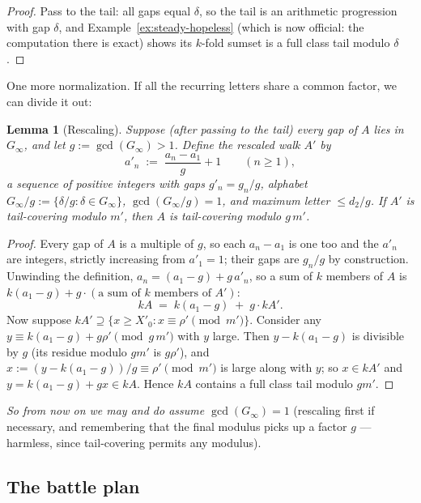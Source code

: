 \documentclass[11pt,reqno]{amsart}
\theoremstyle{plain}
\newtheorem{lemma}[theorem]{Lemma}
\theoremstyle{definition}
\theoremstyle{remark}
\newcommand{\Ginf}{G_\infty}
\begin{document}
\begin{proof}
Pass to the tail: all gaps equal $\delta$, so the tail is an arithmetic progression
with gap $\delta$, and Example~\ref{ex:steady-hopeless} (which is now official: the
computation there is exact) shows its $k$-fold sumset is a full class tail modulo
$\delta$.
\end{proof}

One more normalization. If all the recurring letters share a common factor, we can
divide it out:

\begin{lemma}[Rescaling]\label{lem:rescale-friendly}
Suppose (after passing to the tail) every gap of $A$ lies in $\Ginf$, and let
$g := \gcd(\Ginf) > 1$. Define the \emph{rescaled walk} $A'$ by
\[
  a'_n \;:=\; \frac{a_n - a_1}{g} + 1 \qquad (n \ge 1) ,
\]
a sequence of positive integers with gaps $g'_n = g_n / g$, alphabet $\Ginf/g :=
\{\delta / g : \delta \in \Ginf\}$, $\gcd(\Ginf/g) = 1$, and maximum letter $\le
d_2 / g$. If $A'$ is tail-covering modulo $m'$, then $A$ is tail-covering modulo
$g\,m'$.
\end{lemma}

\begin{proof}
Every gap of $A$ is a multiple of $g$, so each $a_n - a_1$ is one too and the $a'_n$
are integers, strictly increasing from $a'_1 = 1$; their gaps are $g_n / g$ by
construction. Unwinding the definition, $a_n = (a_1 - g) + g\,a'_n$, so a sum of $k$
members of $A$ is $k(a_1 - g) + g \cdot (\text{a sum of $k$ members of } A')$:
\[
  kA \;=\; k(a_1 - g) \;+\; g \cdot kA' .
\]
Now suppose $kA' \supseteq \{x \ge X'_0 : x \equiv \rho' \pmod{m'}\}$. Consider any
$y \equiv k(a_1 - g) + g\rho' \pmod{g\,m'}$ with $y$ large. Then $y - k(a_1-g)$ is
divisible by $g$ (its residue modulo $g m'$ is $g \rho'$), and $x := (y -
k(a_1-g))/g \equiv \rho' \pmod {m'}$ is large along with $y$; so $x \in kA'$ and
$y = k(a_1-g) + gx \in kA$. Hence $kA$ contains a full class tail modulo $g m'$.
\end{proof}

\emph{So from now on we may and do assume $\gcd(\Ginf) = 1$} (rescaling first if
necessary, and remembering that the final modulus picks up a factor $g$ --- harmless,
since tail-covering permits any modulus).

\subsection{The battle plan}\label{sec:battle-plan}
\end{document}
